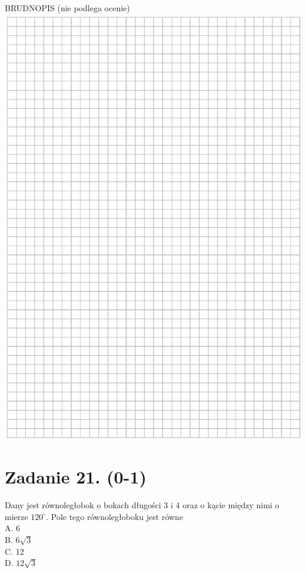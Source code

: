 \documentclass[10pt]{article}
\begin{document}
BRUDNOPIS (nie podlega ocenie)\\
\includegraphics[max width=\textwidth, center]{2024_11_21_0a35d272448d5080a489g-15}

\section*{Zadanie 21. (0-1)}
Dany jest równoległobok o bokach długości 3 i 4 oraz o kącie między nimi o mierze \(120^{\circ}\). Pole tego równoległoboku jest równe\\
A. 6\\
B. \(6 \sqrt{3}\)\\
C. 12\\
D. \(12 \sqrt{3}\)
\end{document}
